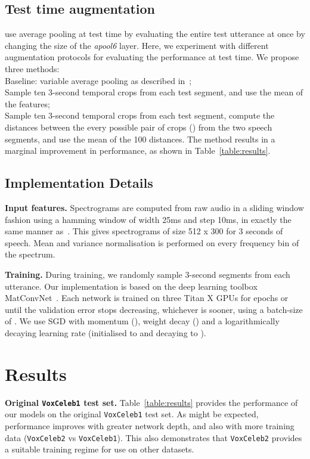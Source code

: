 \documentclass[a4paper]{article}
\def\newpara{\vspace{2pt}}
\def\subsec{\vspace{-5pt}}
\begin{document}
\subsection{Test time augmentation}
\subsec
\label{subsec:testaug}
\cite{Nagrani17} use average pooling at test time by evaluating the entire test utterance at once by changing the size of the {\it apool6} layer. Here, we experiment with different augmentation protocols for evaluating the performance at test time. We propose three methods:\\
 Baseline: variable average pooling as described in~\cite{Nagrani17};\\
 Sample ten 3-second temporal crops from each test segment, and use the mean of the features;\\
 Sample ten 3-second temporal crops from each test segment, compute the distances between the every possible pair of crops () from the two speech segments, and use the mean of the 100 distances.
The method results in a marginal improvement in performance, as shown in Table~\ref{table:results}.


\subsection{Implementation Details} 
\subsec
\newpara\noindent\textbf{Input features.} 
Spectrograms are computed from raw audio  in a sliding window fashion using a hamming window of width 25ms and step
10ms, in exactly the same manner as~\cite{Nagrani17}. This gives spectrograms of size 512 x 300 for
3 seconds of speech.  Mean and variance normalisation is performed on every frequency bin of the spectrum.

\newpara\noindent\textbf{Training.}
During training, we randomly sample 3-second segments from each utterance.
Our implementation is based on the deep learning toolbox MatConvNet~\cite{Vedaldi14a}.
Each network is trained on three Titan X GPUs for  epochs or until the validation error stops decreasing, whichever is sooner, using a batch-size of . We use SGD with momentum (), weight decay () and a logarithmically decaying learning rate (initialised to  and decaying to ). 



\section{Results}
\label{sec:results}
\newpara\noindent\textbf{Original \texttt{VoxCeleb1}  test set.}
Table~\ref{table:results} provides the performance of our models on
the original \texttt{VoxCeleb1} test set. As might be expected, performance improves with greater network depth, and
also with more training data (\texttt{VoxCeleb2} vs \texttt{VoxCeleb1}). This also demonstrates that 
\texttt{VoxCeleb2} provides a suitable training regime for use on other datasets.
\end{document}
